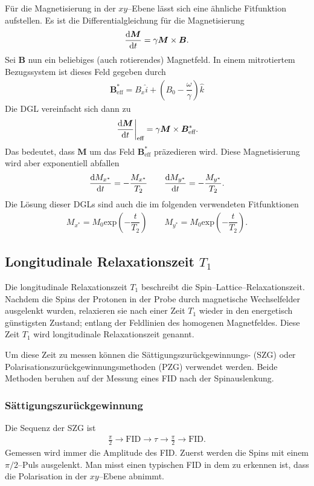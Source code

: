 \documentclass[10pt]{article}
\begin{document}
\begin{multicols}{2}
Für die Magnetisierung in der $xy$--Ebene lässt sich eine ähnliche Fitfunktion aufstellen.
Es ist die Differentialgleichung für die Magnetisierung
\begin{align} 
        \diff[]{\boldsymbol{M}}{t}=\gamma \boldsymbol{M} \times \boldsymbol{B} 
.\end{align} 
Sei $\boldsymbol{B} $ nun ein beliebiges (auch rotierendes) Magnetfeld.
In einem mitrotiertem Bezugssystem ist dieses Feld gegeben durch
\begin{align} 
        \boldsymbol{B}^*_{\text{eff}}=B_x\hat{i}+\left(B_0-\dfrac{\omega }{\gamma }\right)\hat{k}
\end{align} 
Die DGL vereinfacht sich dann zu
\begin{align} 
        \left.\diff[]{\boldsymbol{M} }{t}\right|_{\text{eff}}=\gamma \boldsymbol{M} \times \boldsymbol{B} ^*_{\text{eff}}
.\end{align}
Das bedeutet, dass $\boldsymbol{M}$ um das Feld $\boldsymbol{B}^*_{\text{eff}}$ präzedieren wird.
Diese Magnetisierung wird aber exponentiell abfallen
\begin{align} 
        \diff[]{M_{x^*}}{t}=-\dfrac{M_{x^*}}{T_2}\qquad \diff[]{M_{y^*}}{t}=-\dfrac{M_{y^*}}{T_2}
.\end{align} 
Die Lösung dieser DGLs sind auch die im folgenden verwendeten Fitfunktionen 
\begin{align} 
        M_{x^*}=M_0\text{exp}\left(-\dfrac{t}{T_2}\right)\qquad M_{y^*}=M_0\text{exp}\left(-\dfrac{t}{T_2}\right)
.\end{align} 

\subsection{Longitudinale Relaxationszeit $T_1$}
Die longitudinale Relaxationszeit $T_1$ beschreibt die Spin--Lattice--Relaxationszeit.
Nachdem die Spins der Protonen in der Probe durch magnetische Wechselfelder ausgelenkt wurden, relaxieren sie nach einer Zeit $T_1$ wieder in den energetisch günstigsten Zustand; entlang der Feldlinien des homogenen Magnetfeldes.
Diese Zeit $T_1$ wird longitudinale Relaxationszeit genannt.

Um diese Zeit zu messen können die Sättigungszurückgewinnungs- (SZG) oder Polarisationszurückgewinnungsmethoden (PZG) verwendet werden. 
Beide Methoden beruhen auf der Messung eines FID nach der Spinauslenkung.

\subsubsection{Sättigungszurückgewinnung}
Die Sequenz der SZG ist
\begin{align} 
        \tfrac{\pi }{2}\rightarrow \text{FID}\rightarrow \tau \rightarrow \tfrac{\pi }{2}\rightarrow \text{FID}
.\end{align} 
Gemessen wird immer die Amplitude des FID.
Zuerst werden die Spins mit einem $\pi /2$--Puls ausgelenkt. 
Man misst einen typischen FID in dem zu erkennen ist, dass die Polarisation in der $xy$--Ebene abnimmt.


\end{multicols}
\end{document}
